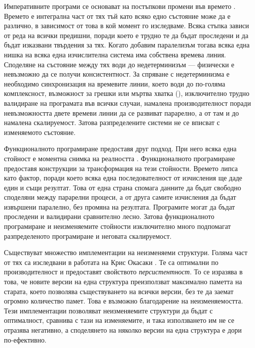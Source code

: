Императивните програми се основават на постъпкови промени във времето \cite{odersky2013ObjectsAndFunctions}. Времето е интегрална част от тях тъй като всяко едно състояние може да е различно, в зависимост от това в кой момент го изследваме. Всяка стъпка зависи от реда на всички предишни, поради което е трудно те да бъдат проследени и да бъдат изказвани твърдения за тях. Когато добавим паралелизъм тогава всяка една нишка на всяка една изчислителна система има собствена времева линия. Споделяне на състояние между тях води до недетерминизъм — физически е невъзможно да се получи консистентност. За спряване с недетерминизма е необходимо синхронизация на времевите линии, което води до по-голяма комплексност, възможност за грешки или мъртва хватка (), изключително трудно валидиране на програмата във всички случаи, намалена производителност поради невъзможността двете времеви линии да се развиват парарелно, а от там и до намалена скалируемост. Затова разпределените системи не се вписват с изменяемото състояние.

Функционалното програмиране предоставя друг подход. При него всяка една стойност е моментна снимка на реалността \cite{odersky2013ObjectsAndFunctions}\cite[глава 3]{bernhardt2015ReactiveWeb}. Функционалното програмиране предоставя конструкции за трансформация на тези стойности. Времето липса като фактор, поради което всяка една последователност от изчисления ще даде един и същи резултат. Това от една страна спомага данните да бъдат свободно споделяни между парарелни процеси, а от друга самите изчисления да бъдат извършени паралелно, без промяна на резултата. Програмите могат да бъдат проследени и валидирани сравнително лесно. Затова функционалното програмиране и неизменяемите стойности изключително много подпомагат разпределеното програмиране и неговата скалируемост.

Съществуват множество имплементации на неизменяеми структури. Голяма част от тях са изследвани в работата на Крис Окасаки \cite{okasakiFunctionalDS}. Те са оптимални по производителност и предоставят свойството \emph{персистентност}. То се изразява в това, че новите версии на една структура преизползват максимално паметта на старата, което позволява съществуването на всички версии, без те да заемат огромно количество памет. Това е възможно благодарение на неизменяемостта. Тези имплементации позволяват неизменяемите структури да бъдат с оптималност, сравнива с тази на изменяемите, и така използването им не се отразява негативно, а споделянето на няколко версии на една структура е дори по-ефективно.

